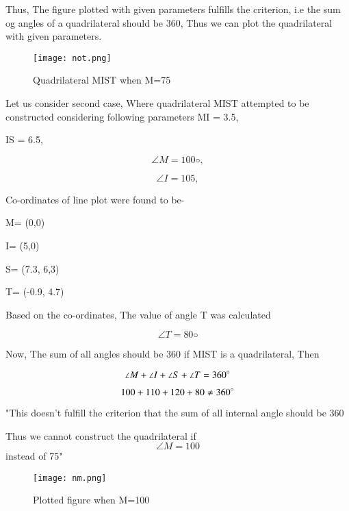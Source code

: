 \documentclass[journal,12pt,twocolumn]{IEEEtran}
\begin{document}
Thus, The figure plotted with given parameters fulfills the criterion, i.e the sum og angles of a quadrilateral should be 360\degree , Thus we can plot the quadrilateral with given parameters.

\begin{figure}[h!]
\texttt{[image: not.png]}
  \caption{Quadrilateral MIST when \angle M=75}
  \label{fig:Quadrilateral MIST}
\end{figure}

Let us consider second case, Where quadrilateral MIST attempted to be constructed considering following parameters
MI = 3.5, 

IS = 6.5,

$$\angle M = 100◦,$$

$$\angle I = 105,$$

Co-ordinates of line plot were found to be-

M= (0,0)

I= (5,0)

S= (7.3, 6,3)

T= (-0.9, 4.7)

Based on the co-ordinates, The value of angle T was calculated

$$\angle T = 80◦$$

Now, The sum of all angles should be 360\degree
if MIST is a quadrilateral, Then

$$\angle M+\angle I+\angle S+\angle T= 360\degree$$

$$100+110+120+80 \neq 360\degree$$

"This doesn't fulfill the criterion that the sum of all internal angle should be 360\degree

Thus we cannot construct the quadrilateral if $$\angle M= 100$$ instead of 75\degree "

\begin{figure}[h!]
\texttt{[image: nm.png]}
  \caption{Plotted figure when \angle M=100}
  \label{fig:Plotted figure when \angle M=100}
\end{figure}
\end{document}

